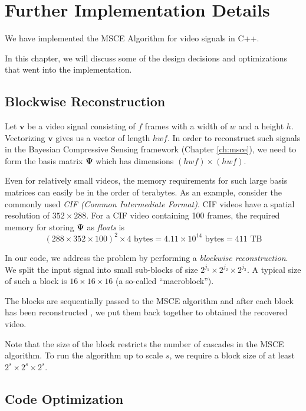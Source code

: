 \chapter{Further Implementation Details}
\label{ch:code}
We have implemented the MSCE Algorithm for video signals in C++.

In this chapter, we will discuss some of the design decisions and optimizations that went into the implementation.

\section{Blockwise Reconstruction}
Let $\bm v$ be a video signal consisting of $f$ frames with a width of $w$ and a height $h$.
Vectorizing $\bm v$ gives us a vector of length $hwf$.
In order to reconstruct such signals in the Bayesian Compressive Sensing framework (Chapter \ref{ch:msce}), we need to form the basis matrix $\bm\Psi$ which has dimensions $(hwf)\times (hwf)$.

Even for relatively small videos, the memory requirements for such large basis matrices can easily be in the order of terabytes.
As an example, consider the commonly used \emph{CIF (Common Intermediate Format)}.
CIF videos have a spatial resolution of $352 \times 288$.
For a CIF video containing 100 frames, the required memory for storing $\bm\Psi$ as \emph{floats} is 
\begin{equation*}
(288\times 352\times 100)^2 \times 4 \mbox{ bytes} = 4.11 \times 10^{14} \mbox{ bytes} = 411 \mbox{ TB}
\end{equation*}

In our code, we address the problem by performing a \emph{blockwise reconstruction}.
We split the input signal into small sub-blocks of size $2^{j_1}\times 2^{j_2}\times 2^{j_3}$.
A typical size of such a block is $16\times 16\times 16$ (a so-called ``macroblock'').

The blocks are sequentially passed to the MSCE algorithm and after each block has been reconstructed , we put them back together to obtained the recovered video.

Note that the size of the block restricts the number of cascades in the MSCE algorithm.
To run the algorithm up to scale $s$, we require a block size of at least $2^s\times 2^s\times 2^s$.

\section{Code Optimization}

